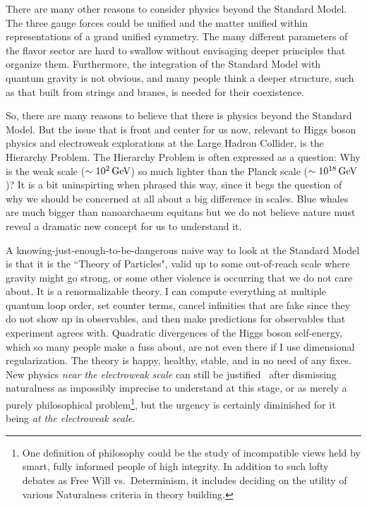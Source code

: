\documentclass[12pt]{article}
\def\gev{\, {\rm GeV}}
\begin{document}
There are many other reasons to consider physics beyond the Standard Model. The three gauge forces could be unified and the matter unified within representations of a grand unified symmetry. The many different parameters of the flavor sector are hard to swallow without envisaging deeper principles that organize them. Furthermore, the integration of the Standard Model with quantum gravity is not obvious, and many people think a deeper structure, such as that built from strings and branes, is needed for their coexistence. 

So, there are many reasons to believe that there is physics beyond the Standard Model. But the issue that is front and center for us now, relevant to Higgs boson physics and electroweak explorations at the Large Hadron Collider, is the Hierarchy Problem. The Hierarchy Problem is often expressed as a question: Why is the weak scale ($\sim 10^2\gev$) so much lighter than the Planck scale ($\sim 10^{18}\gev$)? It is  a bit uninspirting when phrased this way, since it begs the question of why we should be concerned at all about a big difference in scales. Blue whales are much bigger than nanoarchaeum equitans but we do not believe nature must reveal a dramatic new concept for us to understand it.

A knowing-just-enough-to-be-dangerous naive way to look at the Standard Model is that it is the ``Theory of Particles", valid up to some out-of-reach scale where gravity might go strong, or some other violence is occurring that we do not care about. It is a renormalizable theory. I can compute everything at multiple quantum loop order, set counter terms, cancel infinities that are fake since they do not show up in observables, and then make predictions for observables that experiment agrees with. Quadratic divergences of the Higgs boson self-energy, which so many people make a fuss about, are not even there if I use dimensional regularization. The theory is happy, healthy, stable, and in no need of any fixes.  New physics {\it near the electroweak scale} can still be justified~\cite{Wells:2003tf,split susy} after dismissing naturalness as impossibly imprecise to understand at this stage, or as merely a purely philosophical problem\footnote{One definition of philosophy could be the study of incompatible views held by smart, fully informed people of high integrity. In addition to such lofty debates as Free Will vs.\ Determinism, it includes deciding on the utility of various Naturalness criteria in theory building.}, but the urgency is certainly diminished for it being {\it at the electroweak scale}.
\end{document}

